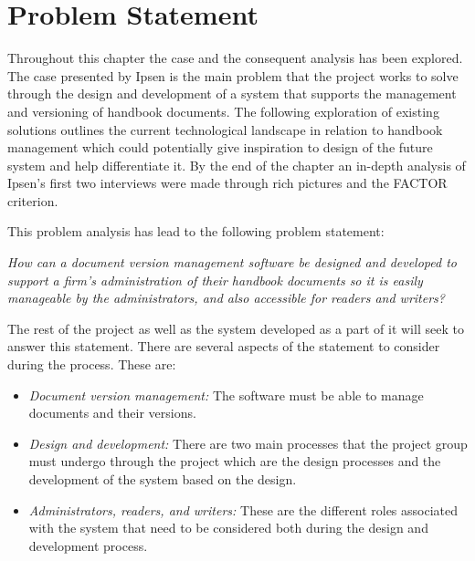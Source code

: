 \section{Problem Statement} \label{problemstatement}
Throughout this chapter the case and the consequent analysis has been explored.
The case presented by Ipsen is the main problem that the project works to solve through the design and development of a system that supports the management and versioning of handbook documents. 
The following exploration of existing solutions outlines the current technological landscape in relation to handbook management which could potentially give inspiration to design of the future system and help differentiate it.
By the end of the chapter an in-depth analysis of Ipsen's first two interviews were made through rich pictures and the FACTOR criterion.

This problem analysis has lead to the following problem statement:

\begin{center}
\textit{How can a document version management software be designed and developed to support a firm's administration of their handbook documents so it is easily manageable by the administrators, and also accessible for readers and writers?}
\end{center}

The rest of the project as well as  the system developed as a part of it will seek to answer this statement.
There are several aspects of the statement to consider during the process.
These are:
\begin{itemize}
	\item 
		\textit{Document version management:} 
		The software must be able to manage documents and their versions.
	\item 
		\textit{Design and development:} 
		There are two main processes that the project group must undergo through the project which are the design processes and the development of the system based on the design.
	\item 
		\textit{Administrators, readers, and writers:} 
		These are the different roles associated with the system that need to be considered both during the design and development process.
\end{itemize}
